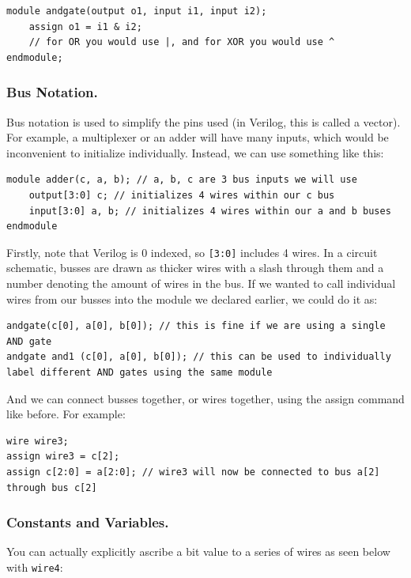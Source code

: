\bs 
\begin{lstlisting}
module andgate(output o1, input i1, input i2);
    assign o1 = i1 & i2;
    // for OR you would use |, and for XOR you would use ^
endmodule;
\end{lstlisting}
\bs


\subsubsection{Bus Notation.} Bus notation is used to simplify the pins used (in Verilog, this is called a vector). For example, a multiplexer or an adder will have many inputs, which would be inconvenient to initialize individually. Instead, we can use  something like this: 

\bs
\begin{lstlisting}
module adder(c, a, b); // a, b, c are 3 bus inputs we will use
    output[3:0] c; // initializes 4 wires within our c bus
    input[3:0] a, b; // initializes 4 wires within our a and b buses
endmodule
\end{lstlisting}
\bs

Firstly, note that Verilog is 0 indexed, so \texttt{[3:0]} includes 4 wires. In a circuit schematic, busses are drawn as thicker wires with a slash through them and a number denoting the amount of wires in the bus. If we wanted to call individual wires from our busses into the  module we declared earlier, we could do it as: 

\bs 
\begin{lstlisting}
andgate(c[0], a[0], b[0]); // this is fine if we are using a single AND gate
andgate and1 (c[0], a[0], b[0]); // this can be used to individually label different AND gates using the same module
\end{lstlisting}
\bs

And we can connect busses together, or wires together, using the assign command like before. For example: 

\bs 
\begin{lstlisting}
wire wire3; 
assign wire3 = c[2];
assign c[2:0] = a[2:0]; // wire3 will now be connected to bus a[2] through bus c[2]
\end{lstlisting}
\bs

\subsubsection{Constants and Variables.}

You can actually explicitly ascribe a bit value to a series of wires as seen below with \texttt{wire4}:

